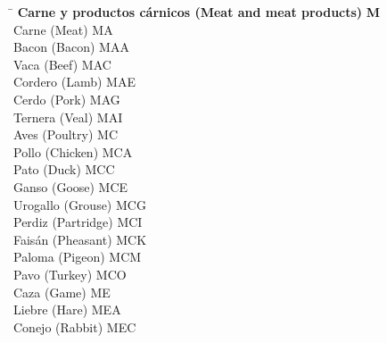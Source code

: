 \begin{small}
    \begin{tabbing}
    \hspace{15cm} \= \hspace{0cm} \kill
        \textbf{Carne y productos cárnicos (Meat and meat products)} \> \textbf{M} \\
            \hspace{0.5cm}Carne (Meat) \> MA \\
                \hspace{1cm}Bacon (Bacon) \> MAA \\
                \hspace{1cm}Vaca (Beef) \> MAC \\
                \hspace{1cm}Cordero (Lamb) \> MAE \\
                \hspace{1cm}Cerdo (Pork) \> MAG \\
                \hspace{1cm}Ternera (Veal) \> MAI \\
            \hspace{0.5cm}Aves (Poultry) \> MC \\
                \hspace{1cm}Pollo (Chicken) \> MCA \\
                \hspace{1cm}Pato (Duck) \> MCC \\
                \hspace{1cm}Ganso (Goose) \> MCE \\
                \hspace{1cm}Urogallo (Grouse) \> MCG \\
                \hspace{1cm}Perdiz (Partridge) \> MCI \\
                \hspace{1cm}Faisán (Pheasant) \> MCK \\
                \hspace{1cm}Paloma (Pigeon) \> MCM \\
                \hspace{1cm}Pavo (Turkey) \> MCO \\
            \hspace{0.5cm}Caza (Game) \> ME \\
                \hspace{1cm}Liebre (Hare) \> MEA \\
                \hspace{1cm}Conejo (Rabbit) \> MEC \\

\end{tabbing}
\end{small}
